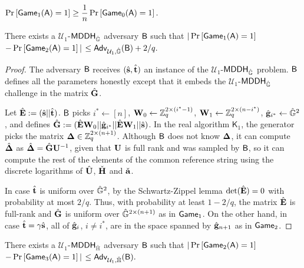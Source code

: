 \begin{lemma} $\Pr\left[ \mathsf{Game}_1(\mathsf{A})=1\right]\geq\dfrac{1}{n}\Pr\left[\mathsf{Game}_0(\mathsf{A})=1\right].$
\label{lemma:bits1}
\end{lemma}

\begin{lemma} There exists a $\mathcal{U}_1$-$\mathsf{MDDH}_{\hat{\mathbb{G}}}$ adversary $\mathsf{B}$ such that
$|\Pr\left[\mathsf{Game}_{1}(\mathsf{A})=1\right]$ $-\Pr\left[\mathsf{Game}_{2}(\mathsf{A})=1\right]|$ $\leq
    \mathsf{Adv}_{\mathcal{U}_1,{\hat{\mathbb{G}}}}(\mathsf{B}) + 2/q.$
\label{lemma:bits2}
\end{lemma}
\begin{proof}
The adversary $\mathsf{B}$ receives $({\hat{\mathbf{s}}}, {\hat{\mathbf{t}}})$ an instance of the $\mathcal{U}_1$-$\mathsf{MDDH}_{\hat{\mathbb{G}}}$ problem.
$\mathsf{B}$ defines all the parameters honestly except that
it embeds the $\mathcal{U}_1$-$\mathsf{MDDH}_{\hat{\mathbb{G}}}$ challenge in the matrix 
$\hat{\mathbf{{G}}}$.

Let ${\hat{\mathbf{{E}}}}:=({\hat{\mathbf{s}}}||{\hat{\mathbf{t}}})$. $\mathsf{B}$ picks $i^*\gets[n]$, $\mathbf{{W}}_0\gets\mathbb{Z}_q^{2\times(i^*-1)}$,
$\mathbf{{W}}_1\gets\mathbb{Z}_q^{2\times(n-i^*)}$,
$\hat{\mathbf{g}}_{i^*}\gets{\ensuremath{\hat{\mathbb{G}}}}^{2}$,
and defines $\hat{\mathbf{{G}}} := ({\hat{\mathbf{{E}}}}\mathbf{{W}}_0||\hat{\mathbf{g}}_{i^*}||{\hat{\mathbf{{E}}}}\mathbf{{W}}_1|| {\hat{\mathbf{s}}})$. 
In the real algorithm $\mathsf{K}_1$, the generator picks the matrix $\mathbf{{\Delta}} \in \mathbb{Z}_q^{2 \times (n+1)}$.
Although $\mathsf{B}$ does not know $\mathbf{{\Delta}}$,  it can compute ${\hat{\mathbf{{\Delta}}}}$ as ${\hat{\mathbf{{\Delta}}}}= \hat{\mathbf{{G}}}\mathbf{{U}}^{-1}$,
given that $\mathbf{{U}}$ is full rank and was  sampled 
by $\mathsf{B}$, so it can compute the rest of the elements of the
common reference string  using the discrete logarithms of ${\hat{\mathbf{{U}}}}$, $\check{\mathbf{{H}}}$ and $\check{\mathbf{a}}$.  

In case ${\hat{\mathbf{t}}}$ is uniform over ${\hat{\mathbb{G}}}^{2}$, by the Schwartz-Zippel lemma $\det({\hat{\mathbf{{E}}}}) = 0$ with probability at most $2/q$.
Thus, with probability at least $1-2/q$, the matrix ${\hat{\mathbf{{E}}}}$ is full-rank and $\hat{\mathbf{{G}}}$ is uniform over ${\hat{\mathbb{G}}}^{2\times(n+1)}$ as in
$\mathsf{Game}_1$.
On the other hand, in case $\hat{\mathbf{t}}=\gamma {\hat{\mathbf{s}}}$, all of $\hat{\mathbf{g}}_{i}$, $i\neq i^*$, are in the space
spanned by $\hat{\mathbf{g}}_{n+1}$ as in $\mathsf{Game}_2$.
%
\end{proof}

\begin{lemma} There exists a $\mathcal{U}_1$-$\mathsf{MDDH}_{\check{\mathbb{H}}}$ adversary $\mathsf{B}$ such that
$|\Pr\left[\mathsf{Game}_{2}(\mathsf{A})=1\right]$ $-\Pr\left[\mathsf{Game}_{3}(\mathsf{A})=1\right]|$ $\leq
\mathsf{Adv}_{\mathcal{U}_1,{\check{\mathbb{H}}}}(\mathsf{B}).$
\label{lemma:bits3}
\end{lemma}


